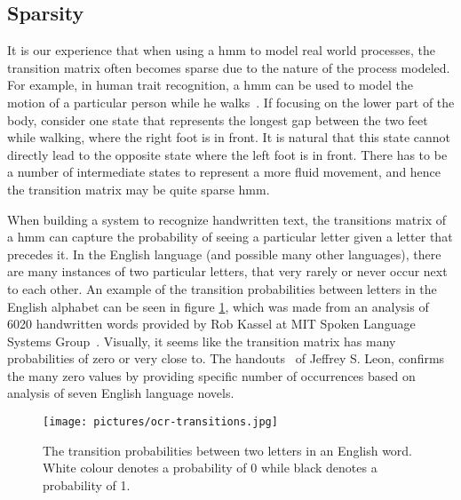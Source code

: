 \subsection{Sparsity}
\label{sec:hmm-and-sparsity}
It is our experience that when using a \gls{hmm} to model real world processes, the transition matrix often becomes sparse due to the nature of the process modeled.
For example, in human trait recognition, a \gls{hmm} can be used to model the motion of a particular person while he walks~\cite{trait-recognition}.
If focusing on the lower part of the body, consider one state that represents the longest gap between the two feet while walking, where the right foot is in front. It is natural that this state cannot directly lead to the opposite state where the left foot is in front. There has to be a number of intermediate states to represent a more fluid movement, and hence the transition matrix may be quite sparse \gls{hmm}.

When building a system to recognize handwritten text, the transitions matrix of a \gls{hmm} can capture the probability of seeing a particular letter given a letter that precedes it.
In the English language (and possible many other languages), there are many instances of two particular letters, that very rarely or never occur next to each other. An example of the transition probabilities between letters in the English alphabet can be seen in figure \ref{fig:ocr-transitions}, which was made from an analysis of 6020 handwritten words provided by Rob Kassel at MIT Spoken Language Systems Group~\cite{thomas-letter-pair-analysis-picture}. Visually, it seems like the transition matrix has many probabilities of zero or very close to. The handouts~\cite{leon-letter-pair-analysis-handouts} of Jeffrey S. Leon, confirms the many zero values by providing specific number of occurrences based on analysis of seven English language novels.

\begin{figure}
	\begin{centering}
		\texttt{[image: pictures/ocr-transitions.jpg]}
		\caption{The transition probabilities between two letters in an English word. White colour denotes a probability of 0 while black denotes a probability of 1.}
		\label{fig:ocr-transitions}
	\end{centering}
\end{figure}